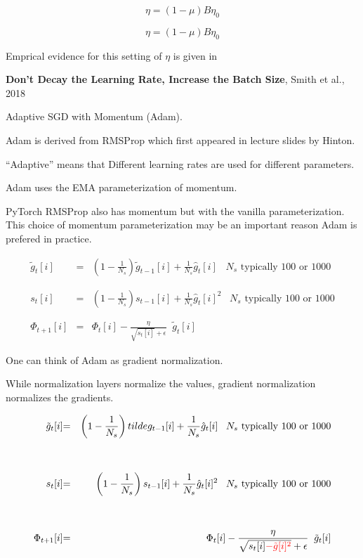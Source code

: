 {\vfill
{\color{red} $$\eta = (1-\mu)B\eta_0$$}


{\color{red} $$\eta = (1-\mu)B\eta_0$$}

\vfill
Emprical evidence for this setting of $\eta$ is given in

\vfill
{\bf Don't Decay the Learning Rate, Increase the Batch Size}, Smith et al., 2018


Adaptive SGD with Momentum (Adam).

\vfill
Adam is derived from RMSProp which first appeared in lecture slides by Hinton.

\vfill
``Adaptive'' means that Different learning rates are used for different parameters.


Adam uses the EMA parameterization of momentum.

\vfill
PyTorch RMSProp also has momentum but with the vanilla parameterization.
\vfill
This choice of momentum  parameterization may be an important reason Adam is prefered in practice.


\begin{eqnarray*}
{ \tilde{g}_t[i]} & { =} & { \left(1-\frac{1}{N_s}\right) \tilde{g}_{t-1}[i] + \frac{1}{N_s} \hat{g}_t[i]}\;\;\;\mbox{$N_s$ typically 100 or 1000} \\
\\
\\
{ s_t[i]} & { =} & { \left(1-\frac{1}{N_s}\right) s_{t-1}[i] + \frac{1}{N_s} \hat{g}_t[i]^2}\;\;\;\mbox{$N_s$ typically 100 or 1000} \\
\\
\\
{ \Phi_{t+1}[i]} & { =} & { \Phi_t[i] - \frac{\eta}{\sqrt{s_t[i]} + \epsilon}\;\; \tilde{g}_t[i]}
\end{eqnarray*}


One can think of Adam as gradient normalization.

\vfill
While normalization layers normalize the values, gradient normalization normalizes the gradients.


\begin{eqnarray*}
{ \tilde{g}_t[i]} & { =} & { \left(1-\frac{1}{N_s}\right) tilde{g}_{t-1}[i] + \frac{1}{N_s} \hat{g}_t[i]}\;\;\;\mbox{$N_s$ typically 100 or 1000} \\
\\
\\
{ s_t[i]} & { =} & { \left(1-\frac{1}{N_s}\right) s_{t-1}[i] + \frac{1}{N_s} \hat{g}_t[i]^2}\;\;\;\mbox{$N_s$ typically 100 or 1000} \\
\\
\\
{ \Phi_{t+1}[i]} & { =} & { \Phi_t[i] - \frac{\eta}{\sqrt{s_t[i] {\color{red} - \tilde{g}[i]^2}} + \epsilon}\;\; \tilde{g}_t[i]}
\end{eqnarray*}

}
